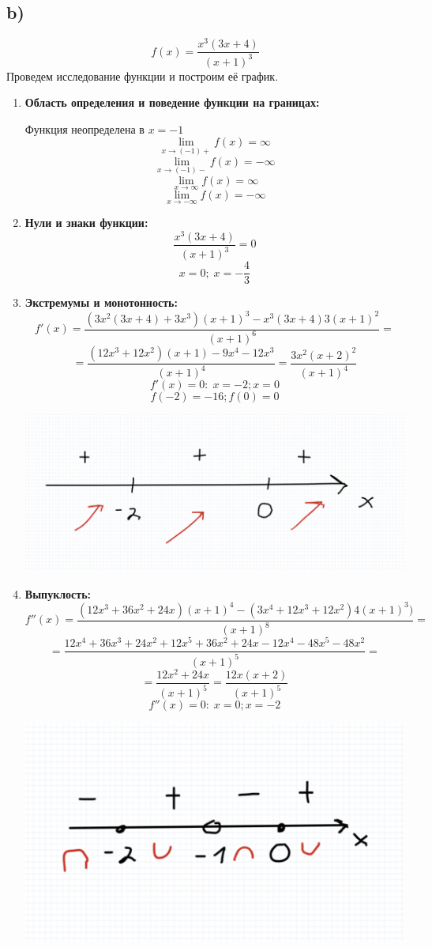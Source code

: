 \documentclass[a4paper,12pt]{article}
\begin{document}
\subsection*{b)}
\[
f(x) = \frac{x^3(3x+4)}{(x+1)^3}
\]
Проведем исследование функции и построим её график.
\begin{enumerate}
\item \textbf{Область определения и поведение функции на границах:}

Функция неопределена в $x = -1$
\[
\lim_{x \rightarrow (-1)+} f(x) = \infty
\]
\[
\lim_{x \rightarrow (-1)-} f(x) = -\infty
\]
\[
\lim_{x \rightarrow \infty} f(x) = \infty
\]
\[
\lim_{x \rightarrow -\infty} f(x) = -\infty
\]

\item \textbf{Нули и знаки функции:}
\[
\frac{x^3(3x+4)}{(x+1)^3} = 0
\]
\[
x = 0; \;x = -\frac{4}{3}
\]
\item \textbf{Экстремумы и монотонность:}
\[
f'(x) = \frac{(3x^2(3x+4) + 3x^3)(x+1)^3 - x^3(3x+4)3(x+1)^2}{(x+1)^6} = 
\]
\[
= \frac{(12x^3 + 12x^2)(x+1) - 9x^4 - 12x^3}{(x+1)^4}  = \frac{3x^2(x+2)^2}{(x+1)^4}
\]
\[
f'(x) = 0 : \; x = -2; x = 0
\]
\[
f(-2) = -16; f(0) = 0
\]
\begin{center}
\includegraphics[scale=0.2]{3.png}
\end{center}
\item \textbf{Выпуклость:}
\[
f''(x) = \frac{(12x^3 + 36x^2 + 24x)(x+1)^4 - (3x^4 +12x^3 +12x^2)4(x+1)^3)}{(x+1)^8} = 
\]
\[
= \frac{12x^4 + 36x^3 + 24x^2 + 12x^5 + 36x^2 +24x -12x^4 -48x^5 -48x^2}{(x+1)^5} =
\]
\[
= \frac{12x^2+ 24x}{(x+1)^5} = \frac{12x(x+2)}{(x+1)^5}
\]
\[
f''(x) = 0 : \; x = 0; x = -2
\]
\begin{center}
\includegraphics[scale=0.22]{4.png}

\end{center}
\end{enumerate}
\end{document}
